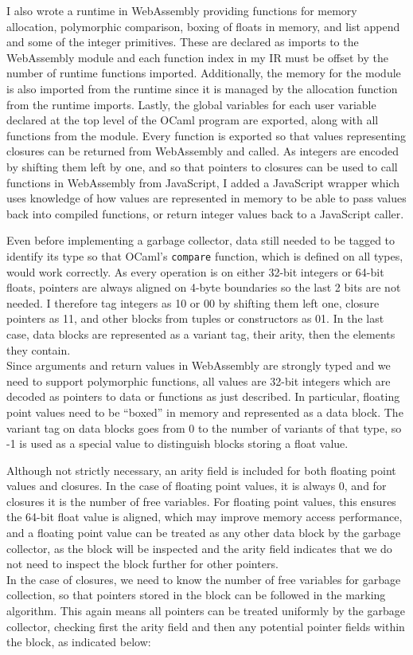 I also wrote a runtime in WebAssembly providing functions for memory allocation, polymorphic comparison, boxing of floats in memory, and list append and some of the integer primitives. These are declared as imports to the WebAssembly module and each function index in my IR must be offset by the number of runtime functions imported. Additionally, the memory for the module is also imported from the runtime since it is managed by the allocation function from the runtime imports. Lastly, the global variables for each user variable declared at the top level of the OCaml program are exported, along with all functions from the module. Every function is exported so that values representing closures can be returned from WebAssembly and called. As integers are encoded by shifting them left by one, and so that pointers to closures can be used to call functions in WebAssembly from JavaScript, I added a JavaScript wrapper which uses knowledge of how values are represented in memory to be able to pass values back into compiled functions, or return integer values back to a JavaScript caller.

Even before implementing a garbage collector, data still needed to be tagged to identify its type so that OCaml's \verb|compare| function, which is defined on all types, would work correctly. As every operation is on either 32-bit integers or 64-bit floats, pointers are always aligned on 4-byte boundaries so the last 2 bits are not needed. I therefore tag integers as 10 or 00 by shifting them left one, closure pointers as 11, and other blocks from tuples or constructors as 01. In the last case, data blocks are represented as a variant tag, their arity, then the elements they contain.  \\
Since arguments and return values in WebAssembly are strongly typed and we need to support polymorphic functions, all values are 32-bit integers which are decoded as pointers to data or functions as just described. In particular, floating point values need to be ``boxed'' in memory and represented as a data block. The variant tag on data blocks goes from 0 to the number of variants of that type, so -1 is used as a special value to distinguish blocks storing a float value.

Although not strictly necessary, an arity field is included for both floating point values and closures. In the case of floating point values, it is always 0, and for closures it is the number of free variables. For floating point values, this ensures the 64-bit float value is aligned, which may improve memory access performance, and a floating point value can be treated as any other data block by the garbage collector, as the block will be inspected and the arity field indicates that we do not need to inspect the block further for other pointers. \\
In the case of closures, we need to know the number of free variables for garbage collection, so that pointers stored in the block can be followed in the marking algorithm. This again means all pointers can be treated uniformly by the garbage collector, checking first the arity field and then any potential pointer fields within the block, as indicated below:

